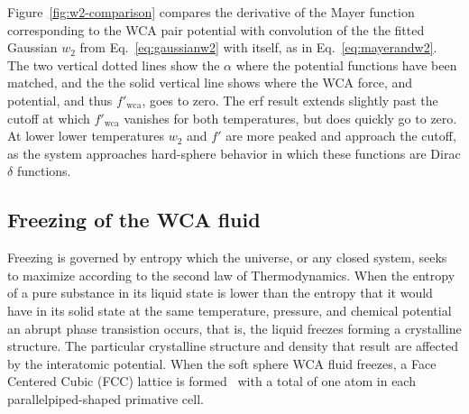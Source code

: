 \documentclass[letterpaper,twocolumn,amsmath,amssymb,prb]{revtex4-1}
\begin{document}
Figure~\ref{fig:w2-comparison} compares the derivative of the Mayer
function corresponding to the WCA pair potential with convolution of
the the fitted Gaussian $w_2$ from Eq.~\ref{eq:gaussianw2} with
itself, as in Eq.~\ref{eq:mayerandw2}.  \color{red}The two vertical dotted lines
show the $\alpha$ where the potential functions have been matched, and
the the solid vertical line shows where the WCA force, and potential,
and thus $f'_{\mathrm{wca}}$, goes to zero. The erf result extends
slightly past the cutoff at which $f'_{\mathrm{wca}}$ vanishes for
both temperatures, but does quickly go to zero. At lower lower
temperatures $w_2$ and $f'$ are more peaked and approach the cutoff, as
the system approaches hard-sphere behavior in which these functions
are Dirac $\delta$ functions.\color{black} 


\subsection{Freezing of the WCA fluid}

Freezing is governed by entropy which the universe, or any closed system, seeks to maximize according to the second law of Thermodynamics. When the entropy of a pure substance in its liquid state is lower than the entropy that it would have in its solid state at the same temperature, pressure, and chemical potential an abrupt phase transistion occurs, that is, the liquid freezes forming a crystalline structure. The particular crystalline structure and density that result are affected by the interatomic potential. When the soft sphere WCA fluid freezes, a Face Centered Cubic (FCC) lattice is formed~\cite{reference!} with a total of one atom in each parallelpiped-shaped primative cell. 
\end{document}
